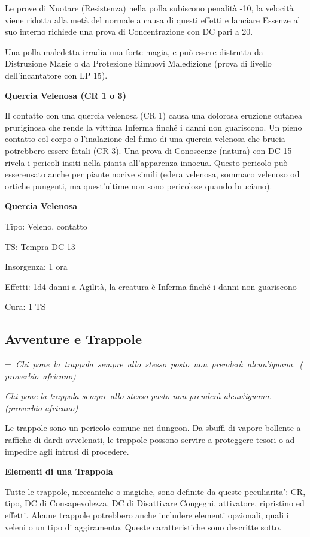 \documentclass[a4paper,11pt,twoside,openany]{book}
\makeatletter
\newcommand{\mybox}[1]{%
	\setbox0=\hbox{#1}%
	\setlength{\@tempdima}{\dimexpr\wd0+13pt}%
	\begin{tcolorbox}[boxrule=0.5pt,arc=4pt, breakable,enhanced,
		left=6pt,right=6pt,top=6pt,bottom=6pt,boxsep=0pt,width=\@tempdima]
		#1
	\end{tcolorbox}
}
\makeatother
\begin{document}
{Le prove di Nuotare (Resistenza) nella polla subiscono penalità -10, la velocità viene ridotta alla metà del normale a causa di questi effetti e lanciare Essenze al suo interno richiede una prova di Concentrazione con DC pari a 20.

Una polla maledetta irradia una forte magia, e può essere distrutta da Distruzione Magie o da Protezione Rimuovi Maledizione (prova di livello dell'incantatore
con LP 15).

\textbf{Quercia Velenosa (CR 1 o 3)}

Il contatto con una quercia velenosa (CR 1) causa una dolorosa eruzione cutanea pruriginosa che rende la vittima Inferma finché i danni non guariscono. Un pieno contatto col corpo o l'inalazione del fumo di una quercia velenosa che brucia potrebbero essere fatali (CR 3). Una prova di Conoscenze (natura) con DC 15 rivela i pericoli insiti nella pianta all'apparenza innocua. Questo pericolo può essereusato anche per piante nocive simili (edera velenosa, sommaco velenoso od ortiche pungenti, ma quest'ultime non sono pericolose quando bruciano).

\textbf{Quercia Velenosa}

Tipo: Veleno, contatto

TS: Tempra DC 13

Insorgenza: 1 ora

Effetti: 1d4 danni a Agilità, la creatura è Inferma finché i danni
non guariscono

Cura: 1 TS

\pagebreak

\subsection{Avventure e Trappole}

\label{avventure-e-trappole}
\mybox{\textit{
Chi pone la trappola sempre allo stesso posto non prenderà alcun'iguana. (proverbio africano)
}}\medskip

Le trappole sono un pericolo comune nei dungeon. Da sbuffi di vapore bollente a raffiche di dardi avvelenati, le trappole possono servire a proteggere tesori o ad impedire agli intrusi di procedere. 

\textbf{Elementi di una Trappola}

Tutte le trappole, meccaniche o magiche, sono definite da queste peculiarita': CR, tipo, DC di Consapevolezza, DC di Disattivare Congegni, attivatore, ripristino ed effetti. Alcune trappole potrebbero anche includere elementi opzionali, quali i veleni o un tipo di aggiramento. Queste caratteristiche sono descritte sotto.

}
\end{document}
